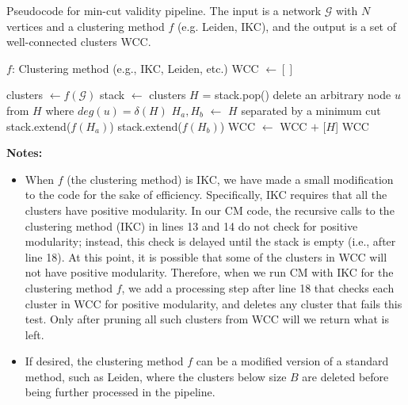 \documentclass[a4paper]{article}   	%
\begin{document}
\clearpage
\begin{algorithm}[h]
\caption{Pseudocode for min-cut validity pipeline. The input is a network $\mathcal{G}$ with $N$ vertices and a clustering method $f$ (e.g. Leiden, IKC), and the output is a set of well-connected clusters WCC.}
\begin{algorithmic}[2]
\State $f$: Clustering method (e.g., IKC, Leiden, etc.)
\State WCC $\gets []$ 

\State clusters $\gets f(\mathcal{G})$ 
\State stack $\gets$ clusters
 
    \State $H$ = stack.pop()
    \State delete an arbitrary node $u$ from $H$ where $deg(u) = \delta(H)$
    \EndWhile
     
        \State $H_a, H_b$ $\gets$ $H$ separated by a minimum cut
        \State stack.extend($f(H_a)$) 
        \State stack.extend($f(H_b)$)  
    \Else
            \State WCC $\gets$ WCC $+$ [$H$] 
        \EndIf
\EndWhile
\State \Return WCC 
\EndFunction
\end{algorithmic}

\label{alg:full-pipeline}
\end{algorithm}

\textbf{Notes:}
\begin{itemize}
\item When
$f$ (the clustering method) is IKC, we have made a small modification to the
code for the sake of efficiency.
Specifically, IKC requires that all the clusters have positive modularity.
 In our CM code, the recursive
calls to the clustering method (IKC) in lines 13 and 14 do not check for positive modularity; instead, this check is delayed until the stack is empty (i.e., after line 18).
At this point, it is possible that some of the clusters in WCC will not have positive modularity.
Therefore, when we run CM with IKC for the clustering method $f$,  we add a processing step after line 18 that checks each cluster in WCC for positive modularity,
and deletes any cluster that fails this test.
Only after pruning all such clusters from WCC will we return what is left.
\item If desired, the clustering method $f$ can be a modified version of a standard method, such as Leiden, where the clusters below size $B$ are deleted before being further processed in the pipeline.
\end{itemize}
\end{document}
